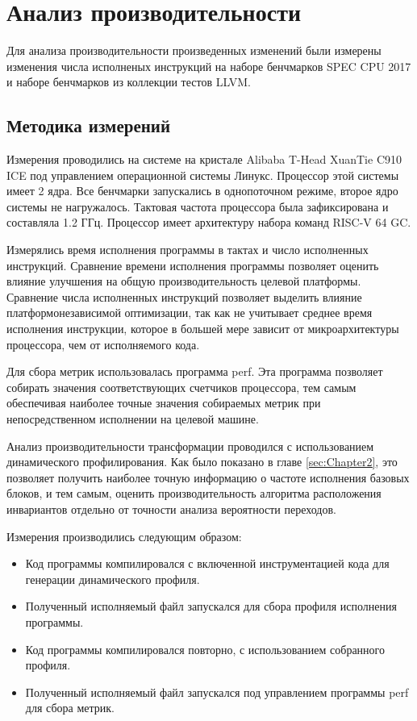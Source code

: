 \section{Анализ производительности}

Для анализа производительности произведенных изменений были измерены изменения числа исполненых инструкций на наборе бенчмарков SPEC CPU\textsuperscript{\tiny\textregistered} 2017 и наборе бенчмарков из коллекции тестов LLVM.

\subsection{Методика измерений}

Измерения проводились на системе на кристале Alibaba T-Head XuanTie C910 ICE под управлением операционной системы Линукс.
Процессор этой системы имеет 2 ядра.
Все бенчмарки запускались в однопоточном режиме, второе ядро системы не нагружалось.
Тактовая частота процессора была зафиксирована и составляла 1.2 ГГц.
Процессор имеет архитектуру набора команд RISC-V 64 GC.

Измерялись время исполнения программы в тактах и число исполненных инструкций.
Сравнение времени исполнения программы позволяет оценить влияние улучшения на общую производительность целевой платформы.
Сравнение числа исполненных инструкций позволяет выделить влияние платформонезависимой оптимизации, так как не учитывает среднее время исполнения инструкции, которое в большей мере зависит от микроархитектуры процессора, чем от исполняемого кода.

Для сбора метрик использовалась программа perf.
Эта программа позволяет собирать значения соответствующих счетчиков процессора, тем самым обеспечивая наиболее точные значения собираемых метрик при непосредственном исполнении на целевой машине.

Анализ производительности трансформации проводился с использованием динамического профилирования.
Как было показано в главе \ref{sec:Chapter2}, это позволяет получить наиболее точную информацию о частоте исполнения базовых блоков, и тем самым, оценить производительность алгоритма расположения инвариантов отдельно от точности анализа вероятности переходов.

Измерения производились следующим образом:
\begin{itemize}
    \item Код программы компилировался с включенной инструментацией кода для генерации динамического профиля.
    \item Полученный исполняемый файл запускался для сбора профиля исполнения программы.
    \item Код программы компилировался повторно, с использованием собранного профиля.
    \item Полученный исполняемый файл запускался под управлением программы perf для сбора метрик.
\end{itemize}

